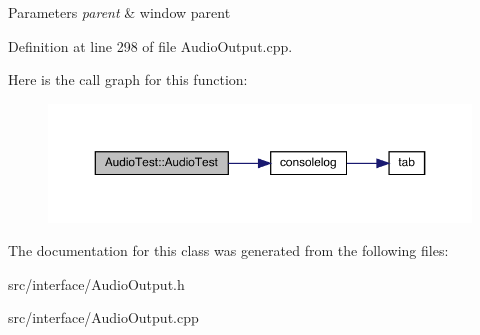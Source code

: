 \begin{DoxyParams}{Parameters}
{\em parent} & window parent \\
\hline
\end{DoxyParams}


Definition at line 298 of file Audio\+Output.\+cpp.

Here is the call graph for this function\+:
\nopagebreak
\begin{figure}[H]
\begin{center}
\leavevmode
\includegraphics[width=350pt]{class_audio_test_a8732c48308ca1352a4d89803553b395e_cgraph}
\end{center}
\end{figure}


The documentation for this class was generated from the following files\+:\begin{DoxyCompactItemize}
\item 
src/interface/Audio\+Output.\+h\item 
src/interface/Audio\+Output.\+cpp\end{DoxyCompactItemize}
